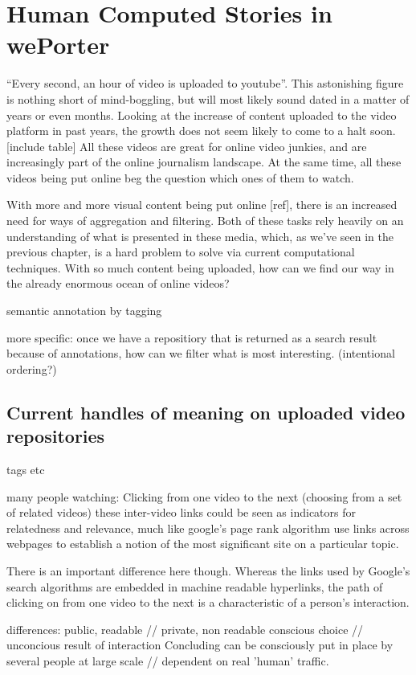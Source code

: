 \documentclass[11pt, a4paper]{report}
\begin{document}
\section{Human Computed Stories in wePorter}
``Every second, an hour of video is uploaded to youtube''. This astonishing figure is nothing short of mind-boggling, but will most likely sound dated in a matter of years or even months. Looking at the increase of content uploaded to the video platform in past years, the growth does not seem likely to come to a halt soon. [include table] All these videos are great for online video junkies, and are increasingly part of the online journalism landscape. At the same time, all these videos being put online beg the question which ones of them to watch.

With more and more visual content being put online [ref], there is an increased need for ways of aggregation and filtering. Both of these tasks rely heavily on an understanding of what is presented in these media, which, as we've seen in the previous chapter, is a hard problem to solve via current computational techniques. With so much content being uploaded, how can we find our way in the already enormous ocean of online videos?

semantic annotation by tagging

more specific: once we have a repositiory that is returned as a search result because of annotations, how can we filter what is most interesting. (intentional ordering?)

\subsection{Current handles of meaning on uploaded video repositories}
tags etc


many people watching:
Clicking from one video to the next (choosing from a set of related videos)
these inter-video links could be seen as indicators for relatedness and relevance, much like google's page rank algorithm use links across webpages to establish a notion of the most significant site on a particular topic. 

There is an important difference here though. Whereas the links used by Google's search algorithms are embedded in machine readable hyperlinks, the path of clicking on from one video to the next is a characteristic of a person's interaction. 

differences:
	public, readable // private, non readable
	conscious choice // unconcious result of interaction
	Concluding
		can be consciously put in place by several people at large scale // dependent on real 'human' traffic.
	
\end{document}
